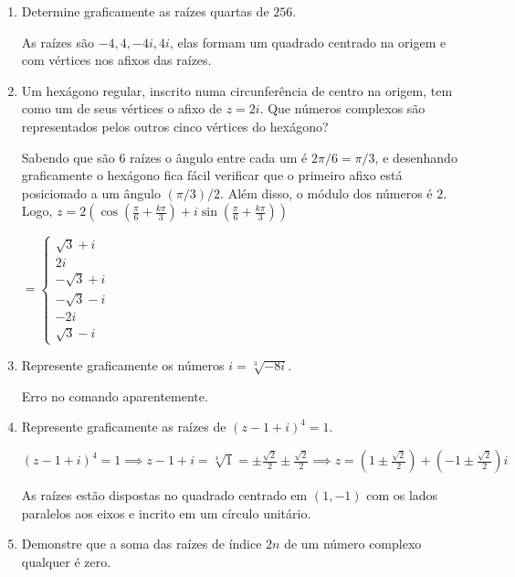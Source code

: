 \documentclass[12pt, openright, a4paper, twoside, english, brazil]{article}
\newenvironment{qitem}{
  \color{black}
\item}{\vspace{10pt}}
\newcommand{\cis}[1]{\displaystyle(\cos#1+i\sin#1)}
\begin{document}
\begin{enumerate}[\bfseries 1.]
\begin{qitem} %
  Determine graficamente as raízes quartas de $256$.

  \color{red}
  As raízes são $-4,4,-4i,4i$, elas formam um quadrado centrado na
  origem e com vértices nos afixos das raízes.
\end{qitem}

\begin{qitem} %
  Um hexágono regular, inscrito numa circunferência de centro na
  origem, tem como um de seus vértices o afixo de $z=2i$. Que números
  complexos são representados pelos outros cinco vértices do hexágono?

  \color{red}
  Sabendo que são 6 raízes o ângulo entre cada um é $2\pi/6=\pi/3$, e
  desenhando graficamente o hexágono fica fácil verificar que o
  primeiro afixo está posicionado a um ângulo $(\pi/3)/2$. Além
  disso, o módulo dos números é $2$. Logo,
  $z=2\cis{\left(\frac{\pi}{6}+\frac{k\pi}{3}\right)}$

  $=
  \begin{cases}\sqrt3+i\\2i\\-\sqrt{3}+i\\-\sqrt3-i\\-2i\\\sqrt3-i
  \end{cases}$
\end{qitem}

\begin{qitem} %
  Represente graficamente os números $i=\sqrt[3]{-8i}$.

  \color{red}
  Erro no comando aparentemente.
\end{qitem}

\begin{qitem} %
  Represente graficamente as raízes de $(z-1+i)^4=1$.

  \color{red}
  $(z-1+i)^4=1\implies
  z-1+i=\sqrt[4]{1}=\pm\frac{\sqrt2}{2}\pm\frac{\sqrt2}{2}\implies
  z=\left(1\pm\frac{\sqrt2}{2}\right)+\left(-1\pm\frac{\sqrt2}{2}\right)i$

  As raízes estão dispostas no quadrado centrado em $(1,-1)$ com os
  lados paralelos aos eixos e incrito em um círculo unitário.
\end{qitem}

\begin{qitem} %
  Demonstre que a soma das raízes de índice $2n$ de um número
  complexo qualquer é zero.


\end{qitem}
\end{enumerate}
\end{document}
